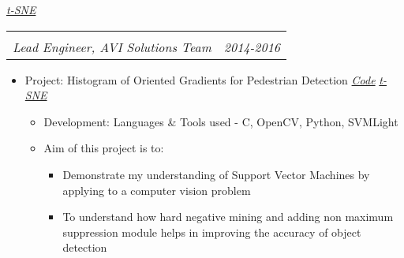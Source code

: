 \documentclass[letterpaper,11pt]{article}
\makeatletter
\def\CC{{C\nolinebreak[4]\hspace{-.05em}\raisebox{.4ex}{\tiny\bf ++}}}
\newcommand{\resitem}[1]{\item #1 \vspace{-2pt}}
\newcommand{\ressubheading}[4]{
	\begin{tabular*}{7.0in}{l@{\extracolsep{\fill}}r}
		\textbf{#1} & #2 \\
		\textit{#3} & \textit{#4} \\
	\end{tabular*}\vspace{-6pt}}
\makeatother
\begin{document}
\begin{itemize}
\begin{itemize}
\begin{itemize}
\begin{itemize}
{								\faImage \hspace{1mm} \href{https://nrupatunga.github.io/project/gist/t-sne/gist-nn-large.png}{\emph{t-SNE}}}
						\end{itemize}
				\end{itemize}
		\end{itemize}
		\ressubheading{}{}{Lead Engineer, AVI Solutions Team}{2014-2016}
		\vspace{1mm}
		\begin{itemize}
				\resitem[]{\faCircleO \hspace{1mm}Project: Histogram of Oriented Gradients for Pedestrian Detection
					\faGithub \hspace{1mm} \href{https://github.com/nrupatunga/Pedestrain-Detection-using-Histogram-of-Oriented-Gradients}{\emph{Code}}
					\faImage \hspace{1mm} \href{https://nrupatunga.github.io/project/hog/tsne.png}{\emph{t-SNE}}}
				\begin{itemize}
						\resitem{Development: Languages \& Tools used - \CC, OpenCV, Python, SVMLight}
				\end{itemize}
				\begin{itemize}
						\resitem{Aim of this project is to:}
						\begin{itemize}
								\resitem{Demonstrate my understanding of Support Vector Machines by applying to a computer vision problem}
								\resitem{To understand how hard negative mining and adding non maximum suppression module helps in improving the accuracy of object detection}
						\end{itemize}
				\end{itemize}


\end{itemize}
\end{itemize}
\end{document}
